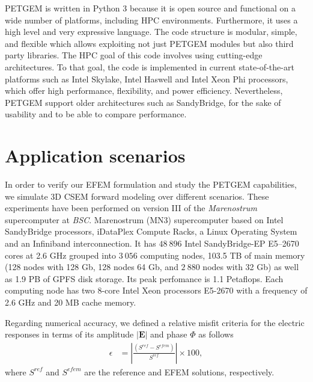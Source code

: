\documentclass[review]{elsarticle}
\begin{document}
PETGEM is written in Python 3 because it is open source and functional on a wide number of platforms, including HPC environments. Furthermore, it uses a high level and very expressive language. The code structure is modular, simple, and flexible which allows exploiting not just PETGEM modules but also third party libraries. The HPC goal of this code involves using cutting-edge architectures. To that goal, the code is implemented in current state-of-the-art platforms such as Intel Skylake, Intel Haswell and Intel Xeon Phi processors, which offer high performance, flexibility, and power efficiency. Nevertheless, PETGEM support older architectures such as SandyBridge, for the sake of usability and to be able to compare performance.

\section{Application scenarios}
In order to verify our EFEM formulation and study the PETGEM capabilities, we simulate 3D CSEM forward modeling over different scenarios. These experiments have been performed on version III of the \textit{Marenostrum} supercomputer at  \textit{BSC}. Marenostrum (MN3) supercomputer based on Intel SandyBridge processors, iDataPlex Compute Racks, a Linux Operating System and an Infiniband interconnection. It has $48\:896$ Intel SandyBridge-EP E5–2670 cores at 2.6 GHz grouped into $3\:056$ computing nodes, 103.5 TB of main memory (128 nodes with 128 Gb, 128 nodes 64 Gb, and $2\:880$ nodes with 32 Gb) as well as 1.9 PB of GPFS disk storage. Its peak perfomance is 1.1 Petaflops. Each computing node has two 8-core Intel Xeon processors E5-2670 with a frequency of 2.6 GHz and 20 MB cache memory.

Regarding numerical accuracy, we defined a relative misfit criteria for the electric responses in terms of its amplitude $|\mathbf{E}|$ and phase $\Phi$ as follows
\begin{align}
\epsilon &= \left|\frac{(S^{ref}-S^{efem})}{S^{ref}}\right| \times 100,
\label{eq:misfits}
\end{align}
where $S^{ref}$ and $S^{efem}$ are the reference and EFEM solutions, respectively. 
\end{document}
